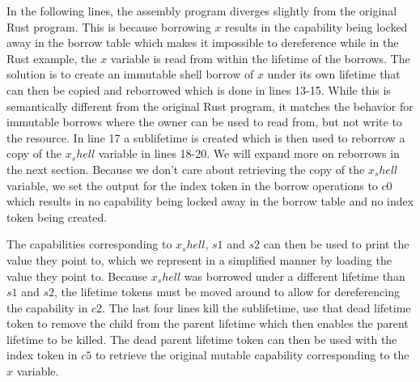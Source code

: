 In the following lines, the assembly program diverges slightly from the original Rust program. 
This is because borrowing $x$ results in the capability being locked away in the borrow table which makes it impossible to dereference while in the Rust example, the $x$ variable is read from within the lifetime of the borrows.
The solution is to create an immutable shell borrow of $x$ under its own lifetime that can then be copied and reborrowed which is done in lines 13-15.
While this is semantically different from the original Rust program, it matches the behavior for immutable borrows where the owner can be used to read from, but not write to the resource.
In line 17 a sublifetime is created which is then used to reborrow a copy of the $x_shell$ variable in lines 18-20.
We will expand more on reborrows in the next section.
Because we don't care about retrieving the copy of the $x_shell$ variable, we set the output for the index token in the borrow operations to $c0$ which results in no capability being locked away in the borrow table and no index token being created.

The capabilities corresponding to $x_shell$, $s1$ and $s2$ can then be used to print the value they point to, which we represent in a simplified manner by loading the value they point to.
Because $x_shell$ was borrowed under a different lifetime than $s1$ and $s2$, the lifetime tokens must be moved around to allow for dereferencing the capability in $c2$.
The last four lines kill the sublifetime, use that dead lifetime token to remove the child from the parent lifetime which then enables the parent lifetime to be killed.
The dead parent lifetime token can then be used with the index token in $c5$ to retrieve the original mutable capability corresponding to the $x$ variable.

